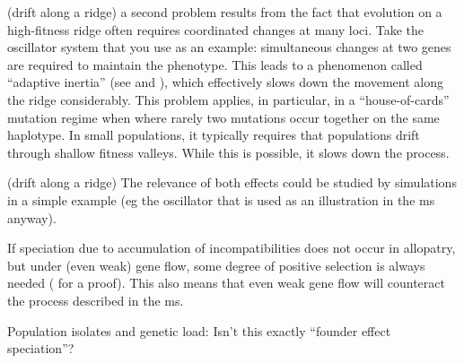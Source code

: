 
\begin{point}{(drift along a ridge)}
    a second problem results from the fact that evolution on a high-fitness ridge
  often requires coordinated changes at many loci. Take the oscillator system
that you use as an example: simultaneous changes at two genes are required to
maintain the phenotype. This leads to a phenomenon called ``adaptive inertia''
(see \citet{baatz1997adaptive} and \citet{alvarez2009effects}),
which effectively slows down the movement along the ridge considerably. This
problem applies, in particular, in a ``house-of-cards'' mutation regime when
where rarely two mutations occur together on the same haplotype. In small
populations, it typically requires that populations drift through shallow
fitness valleys. While this is possible, it slows down the process.  
\end{point}


\begin{point}{(drift along a ridge)}
    The relevance of both effects could be studied by simulations in a simple
example (eg the oscillator that is used as an illustration in the ms anyway).
\end{point}


\begin{point}{}
    If speciation due to accumulation of incompatibilities does not occur in
allopatry, but under (even weak) gene flow, some degree of positive selection
is always needed (\citet{bank2012limits} for a proof). This also
means that even weak gene flow will counteract the process described in the ms.
\end{point}


\begin{point}{}
    Population isolates and genetic load: Isn't this exactly ``founder effect
speciation''?
\end{point}


